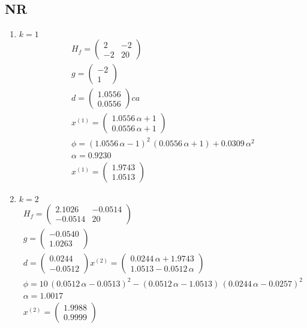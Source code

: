 \subsection{NR}

\begin{enumerate}
\item $k = 1$
\begin{gather*}
H_f = \left(\begin{array}{cc}
2 & -2\\
-2 & 20
\end{array}\right)\\
g = \left(\begin{array}{c}
-2\\
1
\end{array}\right)\\
d = \left(\begin{array}{c}
1.0556\\
0.0556
\end{array}\right)ca \\
x^{(1)} = \left(\begin{array}{c}
1.0556\,\alpha +1\\
0.0556\,\alpha +1
\end{array}\right)\\
\phi = {{\left(1.0556\,\alpha -1\right)}}^2 \,{\left(0.0556\,\alpha +1\right)}+0.0309\,\alpha^2\\
\alpha = 0.9230\\
x^{(1)} =\left(\begin{array}{c}
1.9743\\
1.0513
\end{array}\right)
\end{gather*}

\item $k = 2$
\begin{gather*}
H_f = \left(\begin{array}{cc}
2.1026 & -0.0514\\
-0.0514 & 20
\end{array}\right)\\
g = \left(\begin{array}{c}
-0.0540\\
1.0263
\end{array}\right)\\
d = \left(\begin{array}{c}
0.0244\\
-0.0512
\end{array}\right)
x^{(2)} = \left(\begin{array}{c}
0.0244\,\alpha +1.9743\\
1.0513-0.0512\,\alpha 
\end{array}\right)\\
\phi =10\,{{\left(0.0512\,\alpha -0.0513\right)}}^2 -{\left(0.0512\,\alpha -1.0513\right)}\,{{\left(0.0244\,\alpha -0.0257\right)}}^2\\
\alpha = 1.0017 \\
x^{(2)} = \left(\begin{array}{c}
1.9988\\
0.9999
\end{array}\right)
\end{gather*}
\end{enumerate}

